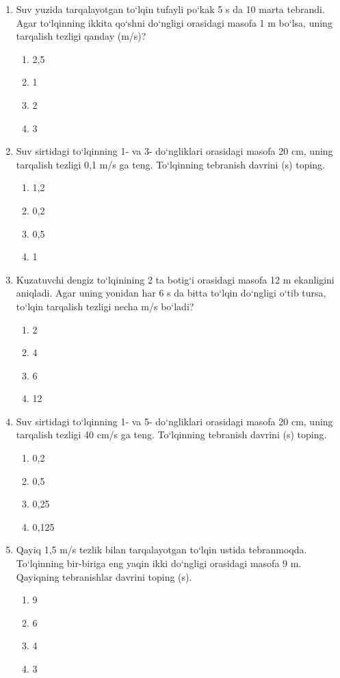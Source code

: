 \begin{enumerate}
\item Suv yuzida tarqalayotgan to‘lqin tufayli po‘kak 5 s da 10 marta tebrandi. Agar to‘lqinning ikkita qo‘shni do‘ngligi orasidagi masofa 1 m bo‘lsa, uning tarqalish tezligi qanday (m/s)?
\begin{enumerate}[label=\Alph*)]
\item 2,5
\item 1
\item 2
\item 3
\end{enumerate}

\item Suv sirtidagi to‘lqinning 1- va 3- do‘ngliklari orasidagi masofa 20 cm, uning tarqalish tezligi 0,1 m/s ga teng. To‘lqinning tebranish davrini (s) toping.
\begin{enumerate}[label=\Alph*)]
\item 1,2
\item 0,2
\item 0,5
\item 1
\end{enumerate}

\item Kuzatuvchi dengiz to‘lqinining 2 ta botig‘i orasidagi masofa 12 m ekanligini aniqladi. Agar uning yonidan har 6 s da bitta to‘lqin do‘ngligi o‘tib tursa, to‘lqin tarqalish tezligi necha m/s bo‘ladi?
\begin{enumerate}[label=\Alph*)]
\item 2
\item 4
\item 6
\item 12
\end{enumerate}

\item Suv sirtidagi to‘lqinning 1- va 5- do‘ngliklari orasidagi masofa 20 cm, uning tarqalish tezligi 40 cm/s ga teng. To‘lqinning tebranish davrini (s) toping.
\begin{enumerate}[label=\Alph*)]
\item 0,2
\item 0,5
\item 0,25
\item 0,125
\end{enumerate}

\item Qayiq 1,5 m/s tezlik bilan tarqalayotgan to‘lqin ustida tebranmoqda. To‘lqinning bir-biriga eng yaqin ikki do‘ngligi orasidagi masofa 9 m. Qayiqning tebranishlar davrini toping (s).
\begin{enumerate}[label=\Alph*)]
\item 9
\item 6
\item 4
\item 3


\end{enumerate}
\end{enumerate}
